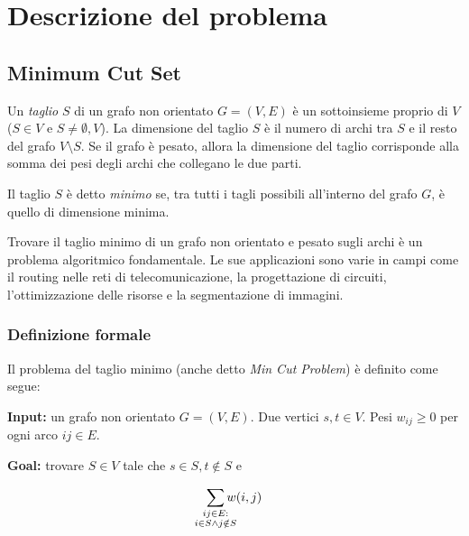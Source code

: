 

\chapter{Descrizione del problema}\label{chap:DescrizioneProblema}

    \section{Minimum Cut Set}
        Un \textit{taglio} $S$ di un grafo non orientato $G = (V,E)$ è un sottoinsieme proprio di $V$ ($S \in V$ e $S \neq \emptyset ,V$). 
        La dimensione del taglio $S$ è il numero di archi tra $S$ e il resto del grafo $V \setminus S$. 
        Se il grafo è pesato, allora la dimensione del taglio corrisponde alla somma dei pesi degli archi che collegano le due parti.
    
        Il taglio $S$ è detto \textit{minimo} se, tra tutti i tagli possibili all'interno del grafo $G$, è quello di dimensione minima.
        
        Trovare il taglio minimo di un grafo non orientato e pesato sugli archi è un problema algoritmico fondamentale.
        Le sue applicazioni sono varie in campi come il routing nelle reti di telecomunicazione, la progettazione di circuiti, l'ottimizzazione delle risorse e la segmentazione di immagini.

        \subsection{Definizione formale}
            Il problema del taglio minimo (anche detto \textit{Min Cut Problem}) è definito come segue:
    
            \textbf{Input:} un grafo non orientato $G = (V, E)$. Due vertici $s,t \in V$. Pesi $w_{ij} \ge 0$ per ogni arco $ij \in E$.
            
            \textbf{Goal:} trovare $S \in V$ tale che $s \in S, t \notin S$ e 
            
            \begin{equation}
                \sum_{\mathclap{\substack{ij \in E : \\ i\in S \land j \notin S}}}w(i,j)
            \end{equation}
    
